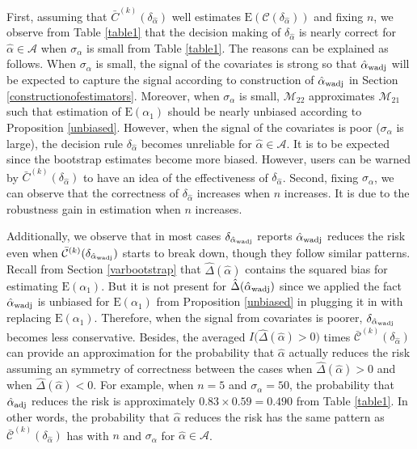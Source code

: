 \documentclass[11pt]{article}
\def\mc#1{\mathcal{#1}} %
\def\E#1{\mathrm{E}(#1)} %
\theoremstyle{definition}
\begin{document}
First, assuming that $\bar{C}^{(k)}(\delta_{\hat{\alpha}})$ well estimates $\E{\mc{C}(\delta_{\hat{\alpha}}})$ and fixing $n$, we  observe from Table \ref{table1} that the decision making of $\delta_{\hat{\alpha}}$ is nearly correct  for $\hat{\alpha}\in \mc{A}$ when $\sigma_{\alpha}$ is small  from Table \ref{table1}. The reasons can be explained as follows. When $\sigma_{\alpha}$ is small, the signal of the covariates is strong so that $\hat{\alpha}_{\rm wadj}$ will be expected to capture the signal according to construction of $\hat{\alpha}_{\rm wadj}$ in Section \ref{constructionofestimators}. Moreover, when $\sigma_{\alpha}$ is small, $\mc{M}_{22}$ approximates $\mc{M}_{21}$ such that estimation of $\E{\alpha_1}$ should be nearly unbiased according to Proposition \ref{unbiased}. However, when the signal of the covariates is poor ($\sigma_{\alpha}$ is large), the decision rule $\delta_{\hat{\alpha}}$  becomes unreliable for $\hat{\alpha}\in \mc{A}$. It is to be expected since the bootstrap estimates become more biased. However, users can be warned by $\bar{C}^{(k)}(\delta_{\hat{\alpha}})$ to have an idea of the effectiveness of $\delta_{\hat{\alpha}}$. Second, fixing $\sigma_{\alpha}$, we can observe that the correctness of $\delta_{\hat{\alpha}}$ increases when $n$ increases. It is due to the robustness gain in estimation when $n$ increases.  


Additionally, we  observe that in most cases $\delta_{\hat{\alpha}_{\rm wadj}}$ reports $\hat{\alpha}_{\rm wadj}$ reduces the risk even when $\bar{\mc{C}}^{(k)}(\delta_{\hat{\alpha}_{\rm wadj}})$ starts to break down, though they  follow similar patterns.   Recall from Section \ref{varbootstrap} that $\hat{\Delta}(\hat{\alpha})$ contains the squared bias for estimating $\E{\alpha_1}$. But it is not present for $\hat{\Delta}(\hat{\alpha}_{\rm wadj})$ since we applied the fact  $\hat{\alpha}_{\rm wadj}$ is unbiased for $\E{\alpha_1}$ from Proposition \ref{unbiased} in plugging it in with replacing $\E{\alpha_1}$. Therefore, when the signal from covariates is poorer, $\delta_{\hat{\alpha}_{\rm wadj}}$ becomes less conservative. Besides, the averaged $I\big(\hat{\Delta}(\hat{\alpha})>0\big)$ times $\bar{\mc{C}}^{(k)}(\delta_{\hat{\alpha}})$ can provide an approximation for the probability that $\hat{\alpha}$ actually reduces the risk assuming an symmetry of correctness between the cases when $\hat{\Delta}(\hat{\alpha})>0$ and when $\hat{\Delta}(\hat{\alpha})<0$. For example, when $n = 5$ and $\sigma_{\alpha}=50$, the probability that $\hat{\alpha}_{\rm adj}$ reduces the risk is approximately $0.83 \times 0.59 = 0.490$ from Table \ref{table1}.  In other words,  the probability that $\hat{\alpha}$ reduces the risk has the same pattern as $\bar{\mc{C}}^{(k)}(\delta_{\hat{\alpha}})$ has with $n$ and $\sigma_{\alpha}$ for $\hat{\alpha}\in \mc{A}$.
\end{document}
